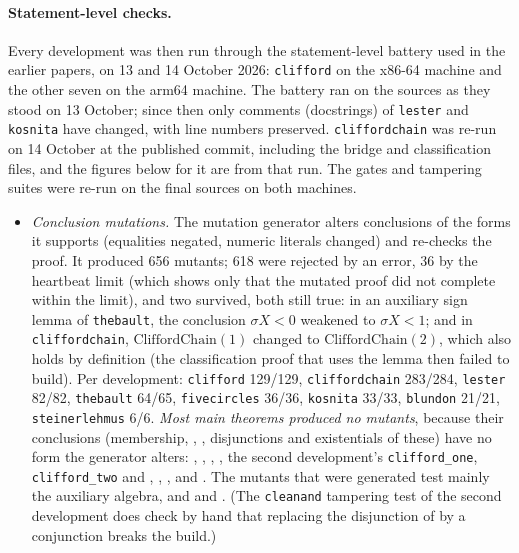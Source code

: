 \documentclass[11pt]{article}
\theoremstyle{definition}
\theoremstyle{remark}
\newcommand{\lean}[1]{\texttt{#1}}
\begin{document}
\paragraph{Statement-level checks.} Every development was then run through the statement-level
battery used in the earlier papers, on 13 and 14 October 2026: \lean{clifford} on the x86-64 machine
and the other seven on the arm64 machine. The battery ran on the sources as they stood on 13 October;
since then only comments (docstrings) of \lean{lester} and \lean{kosnita} have changed, with line numbers
preserved. \lean{cliffordchain} was re-run on 14 October at the published commit, including the bridge
and classification files, and the figures below for it are from that run. The gates and tampering
suites were re-run on the final sources on both machines.
\begin{itemize}
\item \emph{Conclusion mutations.} The mutation generator alters conclusions of the forms it supports
(equalities negated, numeric literals changed) and re-checks the proof. It produced 656 mutants; 618
were rejected by an error, 36 by the heartbeat limit (which shows only that the mutated proof did not
complete within the limit), and two survived, both still true: in an auxiliary sign lemma of
\lean{thebault}, the conclusion $\sigma X<0$ weakened to $\sigma X<1$; and in \lean{cliffordchain},
$\mathrm{CliffordChain}(1)$ changed to $\mathrm{CliffordChain}(2)$, which also holds by definition (the
classification proof that uses the lemma then failed to build). Per development:
\lean{clifford} 129/129, \lean{cliffordchain} 283/284, \lean{lester} 82/82, \lean{thebault} 64/65,
\lean{fivecircles} 36/36, \lean{kosnita} 33/33, \lean{blundon} 21/21, \lean{steinerlehmus} 6/6.
\emph{Most main theorems produced no mutants}, because their conclusions (membership, ,
, disjunctions and existentials of these) have no form the generator alters:
, , ,
, the second development's \lean{clifford\_one}, \lean{clifford\_two} and
, , ,
 and . The mutants that were generated test mainly
the auxiliary algebra, and  and . (The
\lean{cleanand} tampering test of the second development does check by hand that replacing the
disjunction of  by a conjunction breaks the build.)

\end{itemize}
\end{document}
